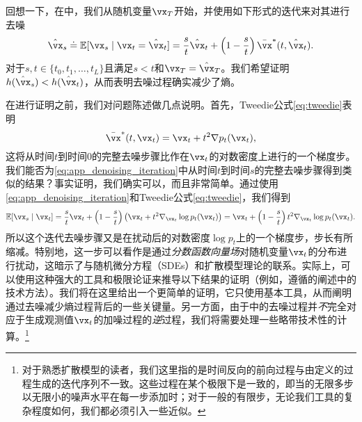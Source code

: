\documentclass[../../book-main_zh.tex]{subfiles}
\begin{document}
回想一下，在中，我们从随机变量\(\vx_{T}\)开始，并使用如下形式的迭代来对其进行去噪
\begin{equation}\label{eq:app_denoising_iteration}
    \hat{\vx}_{s} \doteq \Ex[\vx_{s} \mid \vx_{t} = \hat{\vx}_{t}] = \frac{s}{t}\hat{\vx}_{t} + \bp{1 - \frac{s}{t}}\bar{\vx}^{\ast}(t, \hat{\vx}_{t}).
\end{equation}
对于\(s, t \in \{t_{0}, t_{1}, \dots, t_{L}\}\)且满足\(s < t\)和\(\vx_{T} = \hat{\vx}_{T}\)。我们希望证明\(h(\hat{\vx}_{s}) < h(\hat{\vx}_{t})\)，从而表明去噪过程确实减少了熵。

在进行证明之前，我们对问题陈述做几点说明。首先，Tweedie公式\eqref{eq:tweedie}表明
\begin{equation}
    \bar{\vx}^{\ast}(t, \vx_{t}) = \vx_{t} + t^{2}\nabla p_{t}(\vx_{t}),
\end{equation}
这将从时间\(t\)到时间\(0\)的完整去噪步骤比作在\(\vx_{t}\)的对数密度上进行的一个梯度步。我们能否为\eqref{eq:app_denoising_iteration}中从时间\(t\)到时间\(s\)的完整去噪步骤得到类似的结果？事实证明，我们确实可以，而且非常简单。通过使用\eqref{eq:app_denoising_iteration}和Tweedie公式\eqref{eq:tweedie}，我们得到
\begin{equation}\label{eq:app_denoising_iteration_score}
    \Ex[\vx_{s} \mid \vx_{t}] = \frac{s}{t}\vx_{t} + \bp{1 - \frac{s}{t}}\bp{\vx_{t} + t^{2}\nabla_{\vx_{t}}\log p_{t}(\vx_{t})} = \vx_{t} + \bp{1 - \frac{s}{t}}t^{2}\nabla_{\vx_{t}}\log p_{t}(\vx_{t}).
\end{equation}
所以这个迭代去噪步骤又是在扰动后的对数密度\(\log p_{t}\)上的一个梯度步，步长有所缩减。特别地，这一步可以看作是通过\textit{分数函数向量场}对随机变量\(\vx_{t}\)的分布进行扰动，这暗示了与随机微分方程（SDEs）和扩散模型理论\cite{song2020score}的联系。实际上，可以使用这种强大的工具和极限论证来推导以下结果的证明（例如，遵循\cite{DBLP:conf/iclr/ChenC0LSZ23}的阐述中的技术方法）。我们将在这里给出一个更简单的证明，它只使用基本工具，从而阐明通过去噪减少熵过程背后的一些关键量。另一方面，由于中的去噪过程并\textit{不}完全对应于生成观测值\(\vx_{t}\)的加噪过程的\textit{逆}过程，我们将需要处理一些略带技术性的计算。\footnote{对于熟悉扩散模型的读者，我们这里指的是时间反向的前向过程与由定义的过程生成的迭代序列不一致。这些过程在某个极限下是一致的，即当的无限多步以无限小的噪声水平在每一步添加时；对于一般的有限步，无论我们工具的复杂程度如何，我们都必须引入一些近似。}
\end{document}
